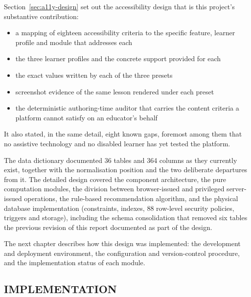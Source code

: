 \documentclass[12pt, oneside]{article} %
\begin{document}
Section~\ref{sec:a11y-design} set out the accessibility design that is this project's substantive contribution:

\begin{itemize}
    \item a mapping of eighteen accessibility criteria to the specific feature, learner profile and module that addresses each
    \item the three learner profiles and the concrete support provided for each
    \item the exact values written by each of the three presets
    \item screenshot evidence of the same lesson rendered under each preset
    \item the deterministic authoring-time auditor that carries the content criteria a platform cannot satisfy on an educator's behalf
\end{itemize}

It also stated, in the same detail, eight known gaps, foremost among them that no assistive technology and no disabled learner has yet tested the platform.

The data dictionary documented 36 tables and 364 columns as they currently exist, together with the normalisation position and the two deliberate departures from it. The detailed design covered the component architecture, the pure computation modules, the division between browser-issued and privileged server-issued operations, the rule-based recommendation algorithm, and the physical database implementation (constraints, indexes, 88 row-level security policies, triggers and storage), including the schema consolidation that removed six tables the previous revision of this report documented as part of the design.

The next chapter describes how this design was implemented: the development and deployment environment, the configuration and version-control procedure, and the implementation status of each module.


\newpage
\vfill \null
\thispagestyle{empty}
\begin{center}
\section{IMPLEMENTATION}
\end{center}
\vspace{2cm}
\end{document}
